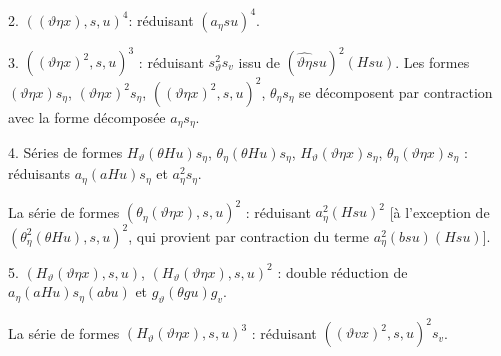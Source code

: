 \documentclass[11pt]{article}
\begin{document}
2. $((\vartheta\eta x),s,u)^4$: réduisant $(a_\eta su)^4$.

3. $((\vartheta\eta x)^2,s,u)^3$ : réduisant $s_\vartheta^2s_v$ issu de $(\widehat{\vartheta\eta}su)^2(Hsu)$. Les formes $(\vartheta\eta x)s_\eta$, $(\vartheta\eta x)^2s_\eta$, $((\vartheta\eta x)^2,s,u)^2$, $\theta_\eta s_\eta$ se décomposent par contraction avec la forme décomposée $a_\eta s_\eta$.

4. Séries de formes $H_\vartheta(\theta Hu)s_\eta$, $\theta_\eta(\theta Hu)s_\eta$, $H_\vartheta(\vartheta\eta x)s_\eta$, $\theta_\eta(\vartheta\eta x)s_\eta$ : réduisants $a_\eta(aHu)s_\eta$ et $a_\eta^2s_\eta$.

La série de formes $(\theta_\eta(\vartheta\eta x),s,u)^2$ : réduisant $a_\eta^2(Hsu)^2$ [à l'exception de $(\theta_\eta^2(\theta Hu),s,u)^2$, qui provient par contraction du terme $a_\eta^2(bsu)(Hsu)$].

5. $(H_\vartheta(\vartheta\eta x),s,u)$, $(H_\vartheta(\vartheta\eta x),s,u)^2$ : double réduction de $a_\eta(aHu)s_\eta(abu)$ et $g_\vartheta(\theta gu)g_v$.

La série de formes $(H_\vartheta(\vartheta\eta x),s,u)^3$ : réduisant $((\vartheta v x)^2,s,u)^2s_v$.
\end{document}
